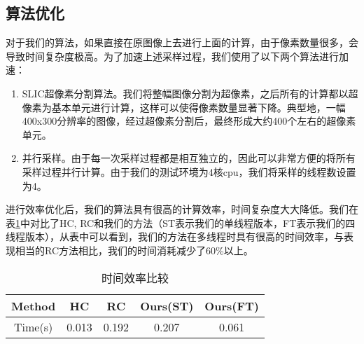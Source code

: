 \subsection{算法优化}
对于我们的算法，如果直接在原图像上去进行上面的计算，由于像素数量很多，会导致时间复杂度极高。为了加速上述采样过程，我们使用了以下两个算法进行加速：
\begin{enumerate}
\item SLIC超像素分割算法\cite{achanta2010slic}。我们将整幅图像分割为超像素，之后所有的计算都以超像素为基本单元进行计算，这样可以使得像素数量显著下降。典型地，一幅400x300分辨率的图像，经过超像素分割后，最终形成大约400个左右的超像素单元。
\item 并行采样。由于每一次采样过程都是相互独立的，因此可以非常方便的将所有采样过程并行计算。由于我们的测试环境为4核cpu，我们将采样的线程数设置为4。
\end{enumerate}

进行效率优化后，我们的算法具有很高的计算效率，时间复杂度大大降低。我们在表\ref{tab:eff}中对比了HC, RC和我们的方法（ST表示我们的单线程版本，FT表示我们的四线程版本），从表中可以看到，我们的方法在多线程时具有很高的时间效率，与表现相当的RC方法相比，我们的时间消耗减少了60\%以上。

\begin{table}
\centering
\vspace{0.06in}
\begin{tabular}{|c|c|c|c|c|}\hline
Method & HC   & RC   & Ours(ST) & Ours(FT)\\\hline
Time(s)& 0.013& 0.192& 0.207    & 0.061   \\\hline
\end{tabular}
\caption{时间效率比较}\label{tab:eff}
\end{table}
